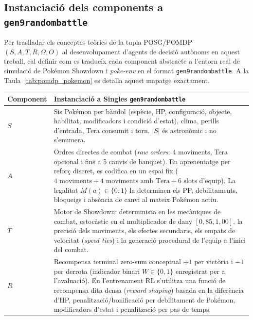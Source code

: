 \subsection{Instanciació dels components a \texttt{gen9randombattle}}

Per traslladar els conceptes teòrics de la tupla POSG/POMDP $(S, A, T, R, \Omega, O)$ al desenvolupament d'agents de decisió autònoms en aquest treball, cal definir com es tradueix cada component abstracte a l'entorn real de simulació de Pokémon Showdown i \textit{poke-env} en el format \texttt{gen9randombattle}. A la Taula~\ref{tab:pomdp_pokemon} es detalla aquest mapatge exactament.

\begin{table}[htbp]
    \centering
    \small
    \renewcommand{\arraystretch}{1.35}
    \begin{tabularx}{\textwidth}{l>{\raggedright\arraybackslash}X}
        \toprule
        \textbf{Component} & \textbf{Instanciació a Singles \texttt{gen9randombattle}} \\
        \midrule
        $S$      & Sis Pokémon per bàndol (espècie, HP, configuració, objecte, habilitat, modificadors i condició d'estat), clima, perills d'entrada, Tera consumit i torn. $|S|$ és astronòmic i no s'enumera. \\
        \arrayrulecolor{gray!30}\hline\arrayrulecolor{black}
        $A$      & Ordres directes de combat (\emph{raw orders}: 4 moviments, Tera opcional i fins a 5 canvis de banquet). En aprenentatge per reforç discret, es codifica en un espai fix ($4\text{ moviments} + 4\text{ moviments amb Tera} + 6\text{ slots d'equip}$). La legalitat $M(a)\in\{0,1\}$ la determinen els PP, debilitaments, bloqueigs i absència de canvi al mateix Pokémon actiu. \\
        \arrayrulecolor{gray!30}\hline\arrayrulecolor{black}
        $T$      & Motor de Showdown: determinista en les mecàniques de combat, estocàstic en el multiplicador de dany $[0{,}85,1{,}00]$, la precisió dels moviments, els efectes secundaris, els empats de velocitat (\emph{speed ties}) i la generació procedural de l'equip a l'inici del combat. \\
        \arrayrulecolor{gray!30}\hline\arrayrulecolor{black}
        $R$      & Recompensa terminal zero-sum conceptual $+1$ per victòria i $-1$ per derrota (indicador binari $W\in\{0,1\}$ enregistrat per a l'avaluació). En l'entrenament RL s'utilitza una funció de recompensa dita densa (\emph{reward shaping}) basada en la diferència d'HP, penalització/bonificació per debilitament de Pokémon, modificadors d'estat i penalització per pas de temps. \\

\end{tabularx}
\end{table}
